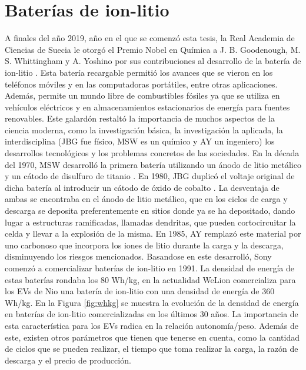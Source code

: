 \section{Baterías de ion-litio}

A finales del año 2019, año en el que se comenzó esta tesis, la Real Academia 
de Ciencias de Suecia le otorgó el Premio Nobel en Química a J. B. Goodenough, 
M. S. Whittingham y A. Yoshino por sus contribuciones al desarrollo de la batería 
de ion-litio \cite{nobel}. Esta batería recargable permitió los avances que se vieron en los 
teléfonos móviles y en las computadoras portátiles, entre otras aplicaciones.
Además, permite un mundo libre de combustibles fósiles ya que se utiliza en 
vehículos eléctricos y en almacenamientos estacionarios de energía para fuentes
renovables. Este galardón restaltó la importancia de muchos aspectos de la ciencia
moderna, como la investigación básica, la investigación la aplicada, la 
interdisciplina (JBG fue físico, MSW es un químico y AY un ingeniero) los 
desarrollos tecnológicos y los problemas concretos de las sociedades.
En la década del 1970, MSW desarrolló la primera batería utilizando un ánodo de
litio metálico y un cátodo de disulfuro de titanio \cite{whittingham1976}. En 
1980, JBG duplicó el voltaje original de dicha batería al introducir un cátodo 
de óxido de cobalto \cite{mizushima1980}.
La desventaja de ambas se encontraba en el ánodo de litio metálico, que en los 
ciclos de carga y descarga se deposita preferentemente en sitios donde ya se 
ha depositado, dando lugar a estructuras ramificadas, llamadas dendritas, que 
pueden cortocircuitar la celda y llevar a la explosión de la misma. En 1985,
AY remplazó este material por uno carbonoso que incorpora los iones de litio
durante la carga y la descarga, disminuyendo los riesgos mencionados. Basandose
en este desarrolló, Sony comenzó a comercializar baterías de ion-litio en 1991.
La densidad de energía de estas baterías rondaba los 80 Wh/kg, en la actualidad
WeLion comercializa para los EVs de Nio una batería de ion-litio con una 
densidad de energía de 360 Wh/kg. En la Figura \ref{fig:whkg} se muestra la 
evolución de la densidad de energía en baterías de ion-litio comercializadas 
en los últimos 30 años. La importancia de esta característica para los EVs 
radica en la relación autonomía/peso. Además de este, existen otros parámetros 
que tienen que tenerse en cuenta, como la cantidad de ciclos que se pueden 
realizar, el tiempo que toma realizar la carga, la razón de descarga y el 
precio de producción.
